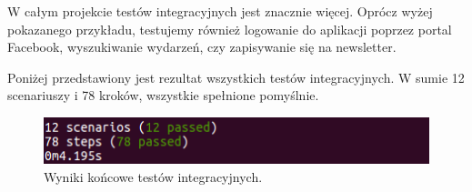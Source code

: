 W całym projekcie testów integracyjnych jest znacznie więcej. Oprócz wyżej pokazanego przykładu, testujemy również logowanie do aplikacji poprzez portal Facebook, wyszukiwanie wydarzeń, czy zapisywanie się na newsletter.

Poniżej przedstawiony jest rezultat wszystkich testów integracyjnych. W sumie 12 scenariuszy i 78 kroków, wszystkie spełnione pomyślnie.

\begin{figure}[h]
  \centering
  \includegraphics[scale=0.8]{images/bdd_result.png}
  \caption{Wyniki końcowe testów integracyjnych.}
\end{figure}

\newpage
